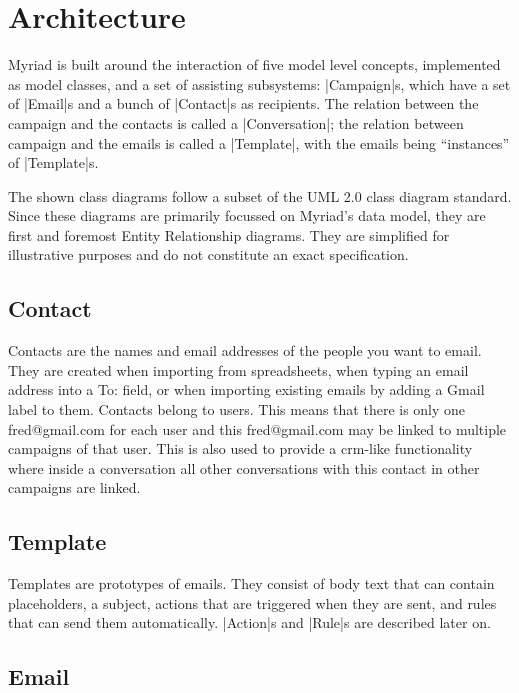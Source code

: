 \section{Architecture}
\label{sec:Architecture}

Myriad is built around the interaction of five model level concepts, implemented as model classes, and a set of assisting subsystems:
|Campaign|s, which have a set of |Email|s and a bunch of |Contact|s as recipients. The relation between the campaign and the contacts is called a |Conversation|; the relation between campaign and the emails is called a |Template|, with the emails being ``instances'' of |Template|s.

The shown class diagrams follow a subset of the UML 2.0 class diagram standard\cite{uml}. Since these diagrams are primarily focussed on Myriad's data model, they are first and foremost Entity Relationship diagrams. They are simplified for illustrative purposes and do not constitute an exact specification.


\subsection{Contact}

Contacts are the names and email addresses of the people you want to email.
They are created when importing from spreadsheets, when typing an email address into a To: field, or when importing existing emails by adding a Gmail label to them. Contacts belong to users. This means that there is only one fred@gmail.com for each user and this fred@gmail.com may be linked to multiple campaigns of that user. This is also used to provide a \gls{crm}-like functionality where inside a conversation all other conversations with this contact in other campaigns are linked.

\subsection{Template}

Templates are prototypes of emails. They consist of body text that can contain placeholders, a subject, actions that are triggered when they are sent, and rules that can send them automatically. |Action|s and |Rule|s are described later on.

\subsection{Email}

